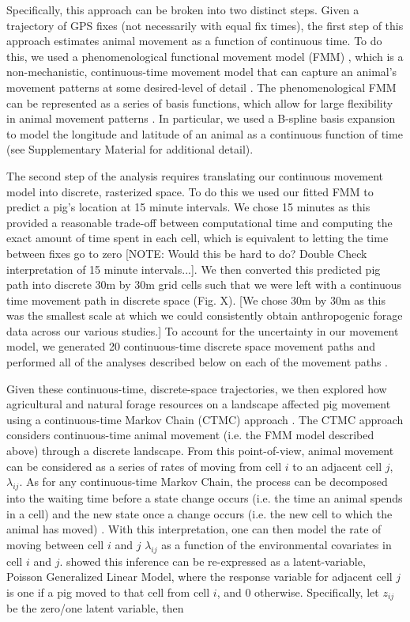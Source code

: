 \documentclass[a4paper]{article}
\begin{document}
Specifically, this approach can be broken into two distinct steps. Given a trajectory of GPS fixes (not necessarily with equal fix times), the first step of this approach estimates animal movement as a function of continuous time.  To do this, we used a phenomenological functional movement model (FMM) \citep{Buderman2016,Hooten2017a}, which is a non-mechanistic, continuous-time movement model that can capture an animal's movement patterns at some desired-level of detail \citep{Buderman2016}.  The phenomenological FMM can be represented as a series of basis functions, which allow for large flexibility in animal movement patterns \citep{Buderman2016}.
In particular, we used a B-spline basis expansion to model the longitude and latitude of an animal as a continuous function of time (see Supplementary Material for additional detail).

The second step of the analysis requires translating our continuous movement model into discrete, rasterized space.  To do this we used our fitted FMM to predict a pig's location at 15 minute intervals. We chose 15 minutes as this provided a reasonable trade-off between computational time and computing the exact amount of time spent in each cell, which is equivalent to letting the time between fixes go to zero [NOTE: Would this be hard to do? Double Check interpretation of 15 minute intervals...]. We then converted this predicted pig path into discrete 30m by 30m grid cells such that we were left with a continuous time movement path in discrete space (Fig. X). [We chose 30m by 30m as this was the smallest scale at which we could consistently obtain anthropogenic forage data across our various studies.]
To account for the uncertainty in our movement model, we generated 20 continuous-time discrete space movement paths and performed all of the analyses described below on each of the movement paths \citep{Hanks2015,Buderman2018}.

Given these continuous-time, discrete-space trajectories, we then explored how agricultural and natural forage resources on a landscape affected pig movement using a continuous-time Markov Chain (CTMC) approach \cite{Hanks2015}. The CTMC approach considers continuous-time animal movement (i.e. the FMM model described above) through a discrete landscape. From this point-of-view, animal movement can be considered as a series of rates of moving from cell $i$ to an adjacent cell $j$, $\lambda_{ij}$.  As for any continuous-time Markov Chain, the process can be decomposed into the waiting time before a state change occurs (i.e. the time an animal spends in a cell) and the new state once a change occurs (i.e. the new cell to which the animal has moved) \citep{Allen2003a}.  With this interpretation, one can then model the rate of moving between cell $i$ and $j$ $\lambda_{ij}$ as a function of the environmental covariates in cell $i$ and $j$.  \cite{Hanks2015} showed this inference can be re-expressed as a latent-variable, Poisson Generalized Linear Model, where the response variable for adjacent cell $j$ is one if a pig moved to that cell from cell $i$, and 0 otherwise. Specifically, let $z_{ij}$ be the zero/one latent variable, then
\end{document}

